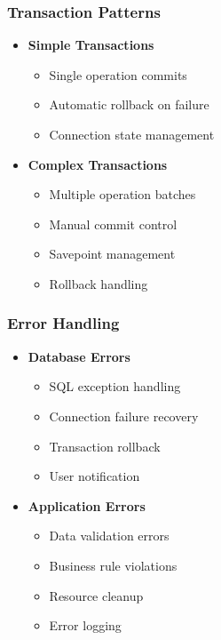 \documentclass[12pt,a4paper]{article}
\begin{document}
\subsubsection{Transaction Patterns}
\begin{itemize}
    \item \textbf{Simple Transactions}
    \begin{itemize}
        \item Single operation commits
        \item Automatic rollback on failure
        \item Connection state management
    \end{itemize}
    
    \item \textbf{Complex Transactions}
    \begin{itemize}
        \item Multiple operation batches
        \item Manual commit control
        \item Savepoint management
        \item Rollback handling
    \end{itemize}
\end{itemize}

\subsubsection{Error Handling}
\begin{itemize}
    \item \textbf{Database Errors}
    \begin{itemize}
        \item SQL exception handling
        \item Connection failure recovery
        \item Transaction rollback
        \item User notification
    \end{itemize}
    
    \item \textbf{Application Errors}
    \begin{itemize}
        \item Data validation errors
        \item Business rule violations
        \item Resource cleanup
        \item Error logging
    \end{itemize}
\end{itemize}
\end{document}
